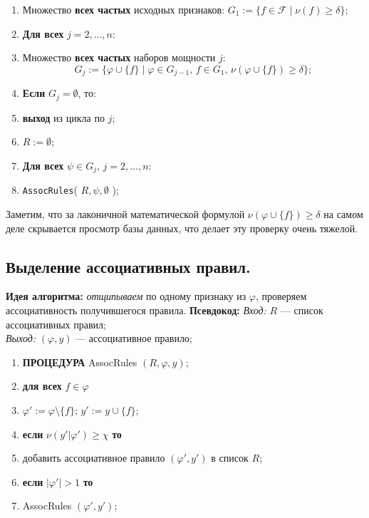 \noindent\hrulefill %
\begin{enumerate}
    \item Множество \textbf{всех частых} исходных признаков: \newline
          \(G_1 := \{ f \in \mathcal{F} \mid \nu(f) \geq \delta \};\)

    \item \textbf{Для всех} \( j = 2, \ldots, n \):
    \item \quad Множество \textbf{всех частых} наборов мощности \( j \):
          \[
              G_j := \{ \varphi \cup \{f\} \mid \varphi \in G_{j-1}, \, f \in G_1, \, \nu(\varphi \cup \{f\}) \geq \delta \};
          \]
    \item \quad \textbf{Если} \( G_j = \emptyset \), то:
    \item \quad  \quad\textbf{выход} из цикла по \( j \);
    \item \( R := \emptyset \);
    \item \textbf{Для всех} \( \psi \in G_j, \, j = 2, \ldots, n \):
    \item \quad \texttt{AssocRules}( \( R, \psi, \emptyset \) );
\end{enumerate}
\noindent\hrulefill %
\newline

Заметим, что за лаконичной математической формулой \(\nu(\varphi \cup \{f\}) \geq \delta \) на самом деле скрывается просмотр базы данных, что делает эту проверку очень тяжелой.

\subsection{Выделение ассоциативных правил.}
\textbf{Идея алгоритма:} \textit{отщипываем} по одному признаку из \(\varphi\), проверяем ассоциативность получившегося правила.
\newline\newline
\textbf{Псевдокод:}
\newline
\textit{Вход:} $R$ — список ассоциативных правил; \\
\textit{Выход:} $(\varphi, y)$ — ассоциативное правило;

\noindent\hrulefill %
\begin{enumerate}
    \item \textbf{ПРОЦЕДУРА} AssocRules $(R, \varphi, y)$;
    \item \quad \textbf{для всех} $f \in \varphi$
    \item \quad \quad $\varphi' := \varphi \setminus \{f\}$; \quad $y' := y \cup \{f\}$;
    \item \quad \quad \textbf{если} $\nu(y' | \varphi') \geq \chi$ \textbf{то}
    \item \quad \quad \quad добавить ассоциативное правило $(\varphi', y')$ в список $R$;
    \item \quad \quad \textbf{если} $|\varphi'| > 1$ \textbf{то}
    \item \quad \quad \quad AssocRules $(\varphi', y')$;
\end{enumerate}
\noindent\hrulefill %
\newline
